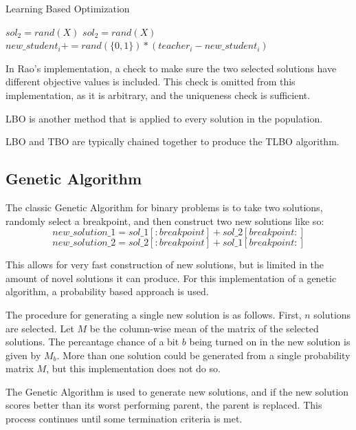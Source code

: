 \documentclass[11pt, letterpaper, onecolumn]{article}
\begin{document}
\begin{algorithm}
\caption{Learning Based Optimization}
\begin{algorithmic}
\STATE $sol_2 = rand(X)$
\STATE $sol_2 = rand(X)$
\ENDWHILE
{}
\STATE $new\_student_i \mathrel{{+}{=}} rand(\{0,1\}) * (teacher_i - new\_student_i)$
\ENDFOR
{}
\ENDIF
\ENDFOR
\end{algorithmic}
\end{algorithm}

In Rao's implementation, a check to make sure the two selected solutions have different objective values is included. This check is omitted from this implementation, as it is arbitrary, and the uniqueness check is sufficient. 

LBO is another method that is applied to every solution in the population. 

LBO and TBO are typically chained together to produce the TLBO algorithm. 

\clearpage 
\subsection{Genetic Algorithm}

The classic Genetic Algorithm for binary problems is to take two solutions, randomly select a breakpoint, and then construct two new solutions like so:
\begin{equation}
new\_solution\_1 = sol\_1[:breakpoint] + sol\_2[breakpoint:]
\end{equation}
$$ new\_solution\_2 = sol\_2[:breakpoint] + sol\_1[breakpoint:] $$

This allows for very fast construction of new solutions, but is limited in the amount of novel solutions it can produce. For this implementation of a genetic algorithm, a probability based approach is used. 

The procedure for generating a single new solution is as follows. First, $n$ solutions are selected. Let $M$ be the column-wise mean of the matrix of the selected solutions. The percantage chance of a bit $b$ being turned on in the new solution is given by $M_b$. More than one solution could be generated from a single probability matrix $M$, but this implementation does not do so. 

The Genetic Algorithm is used to generate new solutions, and if the new solution scores better than its worst performing parent, the parent is replaced. This process continues until some termination criteria is met. 
\end{document}
